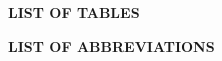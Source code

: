 \documentclass[12pt,a4paper]{report}
\begin{document}
\clearpage
\begin{center}
{\fontsize{16pt}{18pt}\selectfont\textbf{LIST OF TABLES}}
\end{center}
\vspace{0.6cm}
\begingroup
\setlength{\parskip}{0pt}
\makeatletter
{}
\makeatother
\endgroup

\clearpage
\begin{center}
{\fontsize{16pt}{18pt}\selectfont\textbf{LIST OF ABBREVIATIONS}}
\end{center}
\vspace{0.5cm}
\begingroup
\renewcommand{\arraystretch}{1.0}
\setlength{\tabcolsep}{5pt}
\setlength{\parskip}{0pt}
\fontsize{10pt}{11pt}\selectfont
\end{document}
